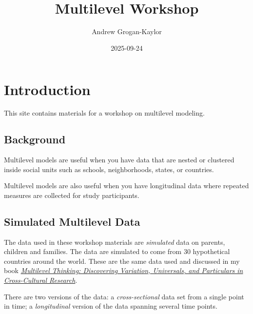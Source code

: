 \documentclass[
  letterpaper,
  DIV=11,
  numbers=noendperiod]{scrreprt}
\title{Multilevel Workshop}
\author{Andrew Grogan-Kaylor}
\date{2025-09-24}
\renewcommand*\contentsname{Table of contents}
\newcommand\contentsname{Table of contents}
\begin{document}
\maketitle

\renewcommand*\contentsname{Table of contents}
{
\hypersetup{linkcolor=}
\setcounter{tocdepth}{2}
\tableofcontents
}
\listoffigures
\listoftables


\chapter{Introduction}\label{introduction}

This site contains materials for a workshop on multilevel modeling.

\section{Background}\label{background}

Multilevel models are useful when you have data that are nested or
clustered inside social units such as schools, neighborhoods, states, or
countries.

Multilevel models are also useful when you have longitudinal data where
repeated measures are collected for study participants.

\section{Simulated Multilevel Data}\label{simulated-multilevel-data}

The data used in these workshop materials are \emph{simulated} data on
parents, children and families. The data are simulated to come from 30
hypothetical countries around the world. These are the same data used
and discussed in my book
\emph{\href{https://academic.oup.com/book/60530}{Multilevel Thinking:
Discovering Variation, Universals, and Particulars in Cross-Cultural
Research}}.

There are two versions of the data: a \emph{cross-sectional} data set
from a single point in time; a \emph{longitudinal} version of the data
spanning several time points.
\end{document}
